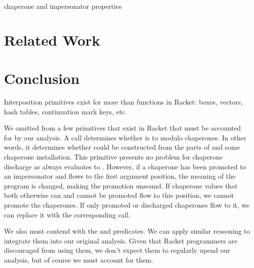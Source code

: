 \documentclass{sigplanconf}
\begin{document}
chaperone and impersonator properties

\section{Related Work}

\section{Conclusion}

Interposition primitives exist for more than functions in Racket: boxes, vectors, hash tables, continuation mark keys, etc.

We omitted from \chapcalc a few primitives that exist in Racket that must be accounted for by our analysis.
A call  determines whether  is  to  modulo chaperones.
In other words, it determines whether  could be constructed from the parts of  and some chaperone installation.
This primitive presents no problem for chaperone discharge as  always evaluates to .
However, if a chaperone has been promoted to an impersonator and flows to the first argument position, the meaning of the program is changed, making the promotion unsound.
If chaperone values that both otherwise can and cannot be promoted flow to this position, we cannot promote the chaperones.
If only promoted or discharged chaperones flow to it, we can replace it with the corresponding  call.

We also must contend with the  and  predicates. We can apply similar reasoning to integrate them into our original analysis.
Given that Racket programmers are discouraged from using them, we don't expect them to regularly upend our analysis, but of course we must account for them.














\end{document}
